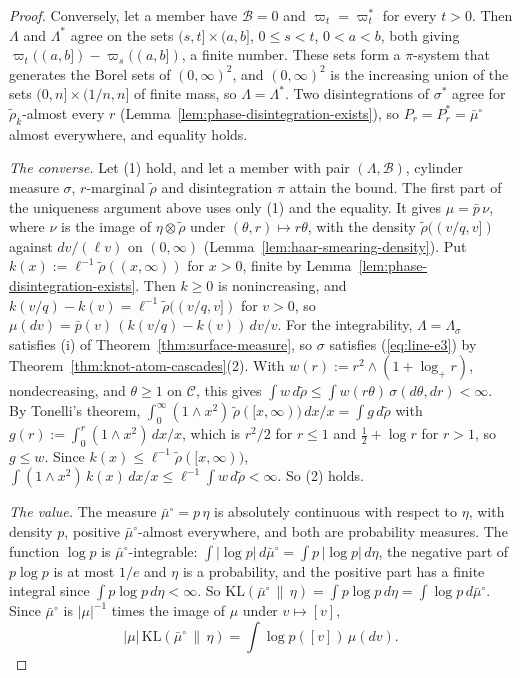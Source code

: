 \begin{proof}
Conversely, let a member have $\mathcal{B} = 0$ and $\varpi_t = \varpi^*_t$ for every $t > 0$. Then
$\Lambda$ and $\Lambda^*$ agree on the sets $(s,t] \times (a,b]$, $0 \le s < t$, $0 < a < b$, both
giving $\varpi_t((a,b]) - \varpi_s((a,b])$, a finite number. These sets form a $\pi$-system that
generates the Borel sets of $(0,\infty)^2$, and $(0,\infty)^2$ is the increasing union of the sets
$(0,n] \times (1/n, n]$ of finite mass, so $\Lambda = \Lambda^*$. Two disintegrations of $\sigma^*$ agree for $\tilde\rho_k$-almost every $r$
(Lemma~\ref{lem:phase-disintegration-exists}), so $P_r = P^*_r = \bar\mu^\circ$ almost everywhere,
and equality holds.

\emph{The converse.} Let (1) hold, and let a member with pair $(\Lambda, \mathcal{B})$, cylinder
measure $\sigma$, $r$-marginal $\tilde\rho$ and disintegration $\pi$ attain the bound. The first
part of the uniqueness argument above uses only (1) and the equality. It gives $\mu = \bar p\,\nu$,
where $\nu$ is the image of $\eta \otimes \tilde\rho$ under $(\theta, r) \mapsto r\theta$, with
the density $\tilde\rho((v/q, v])$ against $dv/(\ell v)$ on $(0,\infty)$
(Lemma~\ref{lem:haar-smearing-density}). Put $k(x) := \ell^{-1}\tilde\rho((x,\infty))$ for $x > 0$,
finite by Lemma~\ref{lem:phase-disintegration-exists}. Then $k \ge 0$ is nonincreasing, and
$k(v/q) - k(v) = \ell^{-1}\tilde\rho((v/q, v])$ for $v > 0$, so
$\mu(dv) = \bar p(v)\,(k(v/q) - k(v))\,dv/v$. For the integrability, $\Lambda = \Lambda_\sigma$
satisfies (i) of Theorem~\ref{thm:surface-measure}, so $\sigma$ satisfies (\ref{eq:line-e3}) by
Theorem~\ref{thm:knot-atom-cascades}(2). With $w(r) := r^2 \wedge (1 + \log_+r)$, nondecreasing,
and $\theta \ge 1$ on $\mathcal{C}$, this gives $\int w\,d\tilde\rho \le \int w(r\theta)\,
\sigma(d\theta, dr) < \infty$. By Tonelli's theorem,
$\int_0^\infty(1 \wedge x^2)\,\tilde\rho([x,\infty))\,dx/x = \int g\,d\tilde\rho$ with
$g(r) := \int_0^r(1 \wedge x^2)\,dx/x$, which is $r^2/2$ for $r \le 1$ and $\tfrac12 + \log r$ for
$r > 1$, so $g \le w$. Since $k(x) \le \ell^{-1}\tilde\rho([x,\infty))$,
$\int(1 \wedge x^2)\,k(x)\,dx/x \le \ell^{-1}\int w\,d\tilde\rho < \infty$. So (2) holds.

\emph{The value.} The measure $\bar\mu^\circ = p\,\eta$ is absolutely continuous with respect to
$\eta$, with density $p$, positive $\bar\mu^\circ$-almost everywhere, and both are probability
measures. The function $\log p$ is $\bar\mu^\circ$-integrable: $\int|\log p|\,d\bar\mu^\circ =
\int p\,|\log p|\,d\eta$, the negative part of $p\log p$ is at most $1/e$ and $\eta$ is a
probability, and the positive part has a finite integral since $\int p\log p\,d\eta < \infty$. So
$\mathrm{KL}(\bar\mu^\circ \,\|\, \eta) = \int p\log p\,d\eta = \int\log p\,d\bar\mu^\circ$. Since
$\bar\mu^\circ$ is $|\mu|^{-1}$ times the image of $\mu$ under $v \mapsto [v]$,
\[
  |\mu|\,\mathrm{KL}(\bar\mu^\circ \,\|\, \eta) = \int\log p([v])\,\mu(dv).
\]


\end{proof}
